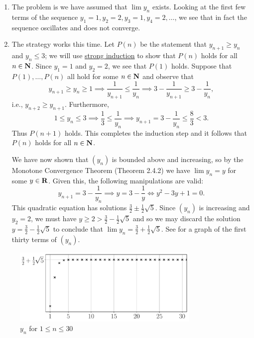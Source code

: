 \documentclass{lew98_solutions}
\begin{document}
\begin{solution}
    \begin{enumerate}
        \item The problem is we have assumed that \( \lim y_n \) exists. Looking at the first few terms of the sequence \( y_1 = 1, y_2 = 2, y_3 = 1, y_4 = 2, \ldots \), we see that in fact the sequence oscillates and does not converge.

        \item The strategy works this time. Let \( P(n) \) be the statement that \( y_{n+1} \geq y_n \) and \( y_n \leq 3 \); we will use \href{https://en.wikipedia.org/wiki/Mathematical_induction#Complete_(strong)_induction}{strong induction} to show that \( P(n) \) holds for all \( n \in \mathbf{N} \). Since \( y_1 = 1 \) and \( y_2 = 2 \), we see that \( P(1) \) holds. Suppose that \( P(1), \ldots, P(n) \) all hold for some \( n \in \mathbf{N} \) and observe that
        \[
            y_{n+1} \geq y_n \geq 1 \implies \frac{1}{y_{n+1}} \leq \frac{1}{y_n} \implies 3 - \frac{1}{y_{n+1}} \geq 3 - \frac{1}{y_n},
        \]
        i.e., \( y_{n+2} \geq y_{n+1} \). Furthermore,
        \[
            1 \leq y_n \leq 3 \implies \frac{1}{3} \leq \frac{1}{y_n} \implies y_{n+1} = 3 - \frac{1}{y_n} \leq \frac{8}{3} < 3.
        \]
        Thus \( P(n + 1) \) holds. This completes the induction step and it follows that \( P(n) \) holds for all \( n \in \mathbf{N} \).

        We have now shown that \( (y_n) \) is bounded above and increasing, so by the Monotone Convergence Theorem (Theorem 2.4.2) we have \( \lim y_n = y \) for some \( y \in \mathbf{R} \). Given this, the following manipulations are valid:
        \[
            y_{n+1} = 3 - \frac{1}{y_n} \implies y = 3 - \frac{1}{y} \iff y^2 - 3y + 1 = 0.
        \]
        This quadratic equation has solutions \( \tfrac{3}{2} \pm \tfrac{1}{2} \sqrt{5} \). Since \( (y_n) \) is increasing and \( y_2 = 2 \), we must have \( y \geq 2 > \tfrac{3}{2} - \tfrac{1}{2} \sqrt{5} \) and so we may discard the solution \( y = \tfrac{3}{2} - \tfrac{1}{2} \sqrt{5} \) to conclude that \( \lim y_n = \tfrac{3}{2} + \tfrac{1}{2} \sqrt{5} \). See  for a graph of the first thirty terms of \( (y_n) \).
    \end{enumerate}
    \begin{figure}[H]
        \centering
        \includegraphics[width=0.8\textwidth]{UA_Figures/UA_ex2_4_2_fig.pdf}
        \caption{\( y_n \) for \( 1 \leq n \leq 30 \)}
        \label{fig:ex2.4.2}
    \end{figure}
\end{solution}
\end{document}

